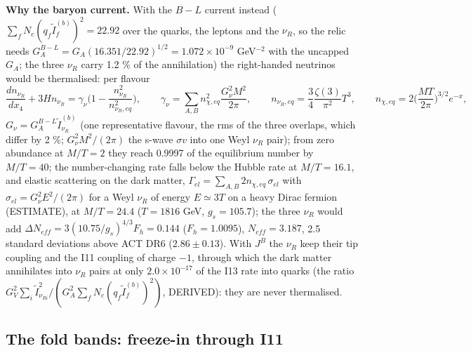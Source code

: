 \documentclass[
  10pt,
]{article}
\begin{document}
\textbf{Why the baryon current.} With the \(B - L\) current instead
(\(\sum_fN_c(q_f\tilde I^{(b)}_f)^2 = 22.92\) over the quarks, the
leptons and the \(\nu_R\), so the relic needs
\(G_A^{B-L} = G_A(16.351/22.92)^{1/2} = 1.072\times10^{-9}\)
GeV\(^{-2}\) with the uncapped \(G_A\); the three \(\nu_R\) carry 1.2 \%
of the annihilation) the right-handed neutrinos would be thermalised:
per flavour
\[ \frac{dn_{\nu_R}}{dx_4} + 3Hn_{\nu_R} = \gamma_\nu\Big(1 - \frac{n_{\nu_R}^2}{n_{\nu_R,eq}^2}\Big),\qquad \gamma_\nu = \sum_{A,B}n_{\chi,eq}^2\frac{G_\nu^2M^2}{2\pi},\qquad
   n_{\nu_R,eq} = \frac34\frac{\zeta(3)}{\pi^2}T^3,\qquad n_{\chi,eq} = 2\Big(\frac{MT}{2\pi}\Big)^{3/2}e^{-x}, \]
\(G_\nu = G_A^{B-L}\tilde I^{(b)}_{\nu_R}\) (one representative flavour,
the rms of the three overlaps, which differ by 2 \%;
\(G_\nu^2M^2/(2\pi)\) the s-wave \(\sigma v\) into one Weyl \(\nu_R\)
pair); from zero abundance at \(M/T = 2\) they reach 0.9997 of the
equilibrium number by \(M/T = 40\); the number-changing rate falls below
the Hubble rate at \(M/T = 16.1\), and elastic scattering on the dark
matter, \(\Gamma_{el} = \sum_{A,B}2n_{\chi,eq}\,\sigma_{el}\) with
\(\sigma_{el} = G_\nu^2E^2/(2\pi)\) for a Weyl \(\nu_R\) of energy
\(E \simeq 3T\) on a heavy Dirac fermion (ESTIMATE), at \(M/T = 24.4\)
(\(T = 1816\) GeV, \(g_s = 105.7\)); the three \(\nu_R\) would add
\(\Delta N_{eff} = 3(10.75/g_s)^{4/3}F_h = 0.144\) (\(F_h = 1.0095\)),
\(N_{eff} = 3.187\), 2.5 standard deviations above ACT DR6
(\(2.86 \pm 0.13\)). With \(J^B\) the \(\nu_R\) keep their tip coupling
and the I11 coupling of charge \(-1\), through which the dark matter
annihilates into \(\nu_R\) pairs at only \(2.0\times10^{-17}\) of the
I13 rate into quarks (the ratio
\(G_V^2\sum_i\tilde I_{\nu_{Ri}}^2/(G_A^2\sum_fN_c(q_f\tilde I^{(b)}_f)^2)\),
DERIVED): they are never thermalised.

\hypertarget{the-fold-bands-freeze-in-through-i11}{%
\subsection{The fold bands: freeze-in through
I11}\label{the-fold-bands-freeze-in-through-i11}}
\end{document}
